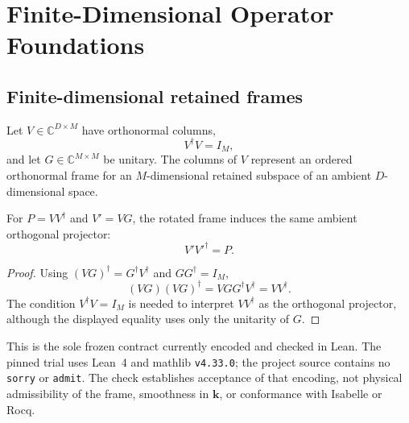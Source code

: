 \chapter{Finite-Dimensional Operator Foundations}

\label{ch:finite-dimensional-foundations}



\section{Finite-dimensional retained frames}


Let $V\in\mathbb C^{D\times M}$ have orthonormal columns,
\begin{equation}
  V^{\dagger}V=I_M,
\end{equation}
and let $G\in\mathbb C^{M\times M}$ be unitary. The columns of $V$ represent an
ordered orthonormal frame for an $M$-dimensional retained subspace of an ambient
$D$-dimensional space.

\begin{proposition}
\label{prop:projector-invariance}
For $P=VV^{\dagger}$ and $V'=VG$, the rotated frame induces the same ambient
orthogonal projector:
\begin{equation}
  V'V'^{\dagger}=P.
\end{equation}
\end{proposition}

\begin{proof}
Using $(VG)^{\dagger}=G^{\dagger}V^{\dagger}$ and
$GG^{\dagger}=I_M$,
\begin{equation}
  (VG)(VG)^{\dagger}
  =VGG^{\dagger}V^{\dagger}
  =VV^{\dagger}.
\end{equation}
The condition $V^{\dagger}V=I_M$ is needed to interpret $VV^{\dagger}$ as the
orthogonal projector, although the displayed equality uses only the unitarity
of $G$.
\end{proof}

This is the sole frozen contract currently encoded and checked in Lean. The
pinned trial uses Lean~4 and mathlib \texttt{v4.33.0}; the project source contains
no \texttt{sorry} or \texttt{admit}. The check establishes acceptance of that
encoding, not physical admissibility of the frame, smoothness in $\mathbf k$,
or conformance with Isabelle or Rocq.

